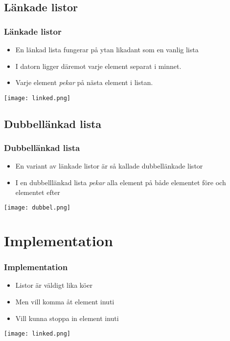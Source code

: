 \documentclass[aspectratio=169]{beamer}
\begin{document}
\subsection{Länkade listor}

\begin{frame}
	\frametitle{Länkade listor}
	
	\begin{itemize}
		\item En länkad lista fungerar på ytan likadant som en vanlig lista
		\item I datorn ligger däremot varje element separat i minnet.
		\item Varje element \textit{pekar} på nästa element i listan.
	\end{itemize}
	
	\texttt{[image: linked.png]}
	
\end{frame}

\subsection{Dubbellänkad lista}

\begin{frame}
	\frametitle{Dubbellänkad lista}
	
	\begin{itemize}
		\item En variant av länkade listor är så kallade dubbellänkade listor
		\item I en dubbelllänkad lista \textit{pekar} alla element på både elementet före och elementet efter
	\end{itemize}
	
	\texttt{[image: dubbel.png]}
	
\end{frame}

\section{Implementation}


\begin{frame}
	\frametitle{Implementation}

	\begin{itemize}
		\item Listor är väldigt lika köer
		\item Men vill komma åt element inuti
		\item Vill kunna stoppa in element inuti
	\end{itemize}
	
	\texttt{[image: linked.png]}

\end{frame}
\end{document}
